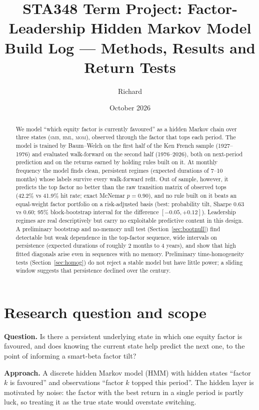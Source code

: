 \documentclass[11pt]{article}
\title{STA348 Term Project: Factor-Leadership Hidden Markov Model\\[4pt]\large Build Log --- Methods, Results and Return Tests}
\author{Richard}
\date{October 2026}
\newcommand{\SMB}{\textsc{smb}}
\newcommand{\HML}{\textsc{hml}}
\newcommand{\MOM}{\textsc{mom}}
\begin{document}
\maketitle

\begin{abstract}
\noindent We model ``which equity factor is currently favoured'' as a hidden Markov chain over three states (\SMB, \HML, \MOM), observed through the factor that tops each period. The model is trained by Baum--Welch on the first half of the Ken French sample (1927--1976) and evaluated walk-forward on the second half (1976--2026), both on next-period prediction and on the returns earned by holding rules built on it. At monthly frequency the model finds clean, persistent regimes (expected durations of 7--10 months) whose labels survive every walk-forward refit. Out of sample, however, it predicts the top factor no better than the raw transition matrix of observed tops (42.2\% vs 41.9\% hit rate; exact McNemar $p=0.90$), and no rule built on it beats an equal-weight factor portfolio on a risk-adjusted basis (best: probability tilt, Sharpe 0.63 vs 0.60; 95\% block-bootstrap interval for the difference $[-0.05,+0.12]$). Leadership regimes are real descriptively but carry no exploitable predictive content in this design. A preliminary bootstrap and no-memory null test (Section~\ref{sec:bootnull}) find detectable but weak dependence in the top-factor sequence, wide intervals on persistence (expected durations of roughly 2 months to 4 years), and show that high fitted diagonals arise even in sequences with no memory. Preliminary time-homogeneity tests (Section~\ref{sec:homog}) do not reject a stable model but have little power; a sliding window suggests that persistence declined over the century.
\end{abstract}

\tableofcontents
\newpage

\section{Research question and scope}

\textbf{Question.} Is there a persistent underlying state in which one equity factor is favoured, and does knowing the current state help predict the next one, to the point of informing a smart-beta factor tilt?

\textbf{Approach.} A discrete hidden Markov model (HMM) with hidden states ``factor $k$ is favoured'' and observations ``factor $k$ topped this period''. The hidden layer is motivated by noise: the factor with the best return in a single period is partly luck, so treating it as the true state would overstate switching.
\end{document}
